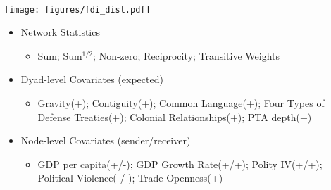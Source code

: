 \documentclass[landscape,a0paper,fontscale=0.285]{baposter} %
\newcommand{\compresslist}{ %
\setlength{\itemsep}{1pt}
\setlength{\parskip}{0pt}
\setlength{\parsep}{0pt}
}
\begin{document}
\begin{poster}
{%

\\
\texttt{[image: figures/fdi\_dist.pdf]}
\vspace*{-\baselineskip}
\begin{itemize}[leftmargin=4mm]\compresslist
\item{Network Statistics}
\begin{itemize}
\item{Sum; Sum$^{1/2}$; Non-zero; Reciprocity; Transitive Weights}
\end{itemize}
\item{Dyad-level Covariates (expected)}
\begin{itemize}
\item{Gravity(+); Contiguity(+); Common Language(+); Four Types of Defense Treaties(+); Colonial Relationships(+); PTA depth(+)}
\end{itemize}
\item{Node-level Covariates (sender/receiver)}
\begin{itemize}
\item{GDP per capita(+/-); GDP Growth Rate(+/+); Polity IV(+/+); Political Violence(-/-); Trade Openness(+)}
\end{itemize}
\end{itemize}



}


\end{poster}
\end{document}

